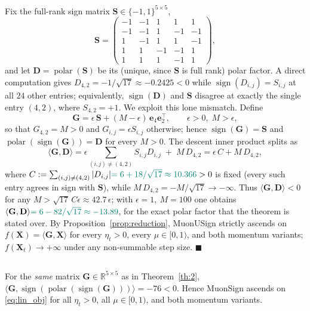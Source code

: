 Fix the full-rank sign matrix $\mathbf{S}\in\{-1,1\}^{5\times 5}$,
\begin{equation}\label{eq:muonsign_S}
\mathbf{S} = \begin{pmatrix}
-1 & -1 &  1 &  1 &  1 \\
-1 & -1 &  1 & -1 & -1 \\
 1 & -1 &  1 &  1 & -1 \\
 1 &  1 & -1 & -1 &  1 \\
 1 &  1 &  1 & -1 &  1
\end{pmatrix},
\end{equation}
and let $\mathbf{D}=\operatorname{polar}(\mathbf{S})$ be its (unique, since $\mathbf{S}$ is full rank) polar factor. A direct computation gives $D_{4,2}=-1/\sqrt{17}\approx-0.2425<0$ while $\operatorname{sign}(D_{i,j})=S_{i,j}$ at all $24$ other entries; equivalently, $\operatorname{sign}(\mathbf{D})$ and $\mathbf{S}$ disagree at exactly the single entry $(4,2)$, where $S_{4,2}=+1$. We exploit this lone mismatch. Define
\begin{equation}\label{eq:muonsign_G}
\mathbf{G} = \epsilon\,\mathbf{S} + (M-\epsilon)\,\mathbf{e}_4\mathbf{e}_2^\top, \qquad \epsilon>0,\; M>\epsilon,
\end{equation}
so that $G_{4,2}=M>0$ and $G_{i,j}=\epsilon S_{i,j}$ otherwise; hence $\operatorname{sign}(\mathbf{G})=\mathbf{S}$ and $\operatorname{polar}(\operatorname{sign}(\mathbf{G}))=\mathbf{D}$ for every $M>0$. The descent inner product splits as
\begin{equation}
\langle \mathbf{G}, \mathbf{D}\rangle
= \epsilon\!\!\sum_{(i,j)\neq(4,2)}\!\! S_{i,j}D_{i,j} \;+\; M\,D_{4,2}
= \epsilon\,C + M\,D_{4,2},
\end{equation}
where $C:=\sum_{(i,j)\neq(4,2)}|D_{i,j}|\cx{=6+18/\sqrt{17}\approx10.366}>0$ is fixed (every such entry agrees in sign with $\mathbf{S}$), while $M\,D_{4,2}=-M/\sqrt{17}\to-\infty$. Thus $\langle\mathbf{G},\mathbf{D}\rangle<0$ for any $M>\sqrt{17}\,C\epsilon\approx42.7\,\epsilon$; with $\epsilon=1,\ M=100$ one obtains $\langle\mathbf{G},\mathbf{D}\rangle\cx{=6-82/\sqrt{17}\approx-13.89}$, for the exact polar factor that the theorem is stated over. By Proposition~\ref{prop:reduction}, MuonUSign strictly ascends on $f(\mathbf{X})=\langle\mathbf{G},\mathbf{X}\rangle$ for every $\eta_t>0$, every $\mu\in[0,1)$, and both momentum variants; $f(\mathbf{X}_t)\to+\infty$ under any non-summable step size. $\blacksquare$

\subsection{}\label{app:proof_th3}
\begin{theorem}\label{th:3}
For the \emph{same} matrix $\mathbf{G}\in\mathbb{R}^{5\times5}$ as in Theorem~\ref{th:2}, $\bigl\langle \mathbf{G},\operatorname{sign}(\operatorname{polar}(\operatorname{sign}(\mathbf{G})))\bigr\rangle=-76<0$. Hence MuonSign ascends on \eqref{eq:lin_obj} for all $\eta_t>0$, all $\mu\in[0,1)$, and both momentum variants.
\end{theorem}

